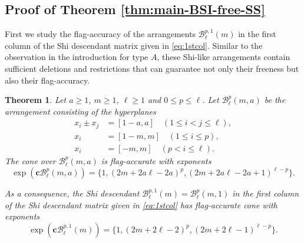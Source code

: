 \documentclass[11pt]{article}
\newtheorem{theorem}[theo]{Theorem}
\theoremstyle{definition}
\numberwithin{equation}{section}
\newcommand{\B}{\mathcal{B}}
\begin{document}
\subsection{Proof of Theorem  \ref{thm:main-BSI-free-SS}}
\label{subsec:F-SS-BSI}
First we study the flag-accuracy of the arrangements $\B^{p,1}_\ell(m)$ in the first column of the Shi descendant matrix given in \eqref{eq:1stcol}. 
Similar to the observation in the introduction for type $A$, these Shi-like arrangements contain sufficient deletions and restrictions that can guarantee not only their freeness but also their flag-accuracy. 
\begin{theorem}
 \label{thm:k=1,l,m,p}
Let $a \ge 1$, $m\ge 1$,  $\ell \ge 1$ and $0 \le p \le \ell$. 
Let $\B^p_\ell(m,a)$ be the arrangement consisting of the hyperplanes
\begin{align*}
x_{i}\pm x_{j} &= [1-a , a]\quad  (1 \leq i < j \leq \ell), \\
x_i&=  [1-m , m] \quad (1 \leq   i \leq p), \\
x_i&=[-m , m]  \quad (p<  i \leq \ell).
\end{align*}
The cone over $\B^p_\ell(m,a)$ is flag-accurate with exponents 
$$\exp(\textbf{c}\B^p_\ell(m, a)) = \{1, (2m+2a\ell-2a)^{p}, (2m+2a\ell-2a+1 )^{\ell-p}\}.$$ 

As a consequence, the Shi descendant $\B^{p,1}_\ell(m) = \B^p_\ell(m, 1) $ in the first column of the Shi descendant matrix given in \eqref{eq:1stcol} has flag-accurate cone with exponents 
$$\exp(\textbf{c}\B^{p,1}_\ell(m)) = \{1, (2m+2\ell-2)^{p}, (2m+2\ell-1)^{\ell-p}\}.$$ 
 \end{theorem} 
 
\end{document}
